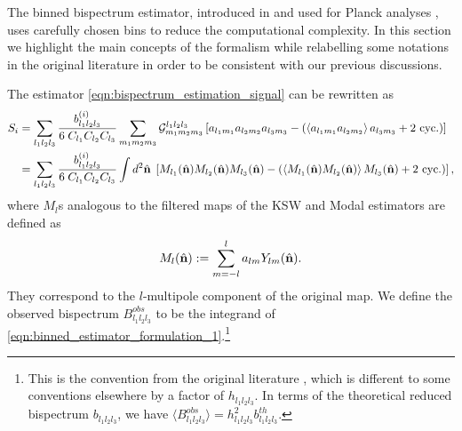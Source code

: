 The binned bispectrum estimator, introduced in \cite{Bucher2010} and used for Planck analyses \cite{PlanckCollaboration2013,PlanckCollaboration2015,PlanckCollaboration2018,Bucher2016}, uses carefully chosen bins to reduce the computational complexity. In this section we highlight the main concepts of the formalism while relabelling some notations in the original literature \cite{Bucher2010} in order to be consistent with our previous discussions.

The estimator \eqref{eqn:bispectrum_estimation_signal} can be rewritten as 
\begin{align}
	S_i &= \sum_{l_1 l_2 l_3}  \frac{b^{(i)}_{l_1 l_2 l_3}}{6 \; C_{l_1} C_{l_2} C_{l_3}} \sum_{m_1 m_2 m_3} \mathcal{G}^{l_1 l_2 l_3}_{m_1 m_2 m_3} \left[ a_{l_1 m_1} a_{l_2 m_2} a_{l_3 m_3} - \left( \left< a_{l_1 m_1} a_{l_2 m_2} \right> a_{l_3 m_3} + \text{2 cyc.} \right) \right] \\
	&= \sum_{l_1 l_2 l_3}  \frac{b^{(i)}_{l_1 l_2 l_3}}{6 \; C_{l_1} C_{l_2} C_{l_3}} \int d^2 \hat{\mathbf{n}} \; \left[ M_{l_1} (\hat{\mathbf{n}}) M_{l_2} (\hat{\mathbf{n}}) M_{l_3} (\hat{\mathbf{n}}) - \left( \left< M_{l_1} (\hat{\mathbf{n}}) M_{l_2} (\hat{\mathbf{n}}) \right> M_{l_3} (\hat{\mathbf{n}}) + \text{2 cyc.}\right)  \right], \label{eqn:binned_estimator_formulation_1}
\end{align}
where $M_l$s analogous to the filtered maps of the KSW and Modal estimators are defined as
\begin{align}
	M_l(\hat{\mathbf{n}}) := \sum_{m=-l}^{l} a_{lm} Y_{lm}(\hat{\mathbf{n}}).
\end{align}
They correspond to the $l$-multipole component of the original map. We define the observed bispectrum $B^{obs}_{l_1 l_2 l_3}$ to be the integrand of \eqref{eqn:binned_estimator_formulation_1}.\footnote{This is the convention from the original literature \cite{Bucher2010}, which is different to some conventions elsewhere by a factor of $h_{l_1 l_2 l_3}$. In terms of the theoretical reduced bispectrum $b_{l_1 l_2 l_3}$, we have $\langle B^{obs}_{l_1 l_2 l_3} \rangle = h^2_{l_1 l_2 l_3} b^{th}_{l_1 l_2 l_3}$.}

